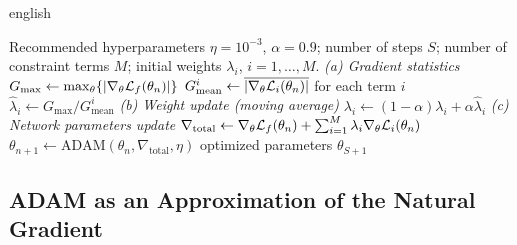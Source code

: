 \documentclass[0000.tex]{subfiles}
\begin{document}
\begin{hyphenrules}{english}
\begin{algorithm}[htbp]
  \caption{Learning rate annealing with ADAM.}
  \label{alg:lra}
  \begin{algorithmic}[1]
    \Require Recommended hyperparameters $\eta=10^{-3}$, $\alpha=0.9$; number of steps $S$; number of
      constraint terms $M$; initial weights $\lambda_i$, $i=1,\dots,M$.
      \State \textit{(a) Gradient statistics}
      \State $G_{\max}\gets\max_\theta\{\left\lvert \nabla_\theta\mathcal{L}_f(\theta_n) \right\rvert\}$ 
      \State $G^{i}_{\mathrm{mean}}\gets\overline{\left\lvert \nabla_\theta\mathcal{L}_i(\theta_n) \right\rvert}$ for each term $i$
      \State $\hat\lambda_i\gets G_{\max}/G^{i}_{\mathrm{mean}}$ 
      \State \textit{(b) Weight update (moving average)}
      \State $\lambda_i\gets(1-\alpha)\lambda_i+\alpha\hat\lambda_i$ 
      \State \textit{(c) Network parameters update}
      \State $\nabla_{\mathrm{total}}\gets\nabla_\theta\mathcal{L}_f(\theta_n)+\sum_{i=1}^{M}\lambda_i\nabla_\theta\mathcal{L}_i(\theta_n)$
      \State $\theta_{n+1}\gets\mathrm{ADAM}(\theta_n,\nabla_{\mathrm{total}},\eta)$ 
    \EndFor
    \State \Return optimized parameters $\theta_{S+1}$
  \end{algorithmic}
\end{algorithm}

\subsection{ADAM as an Approximation of the Natural Gradient}


\end{hyphenrules}
\end{document}
